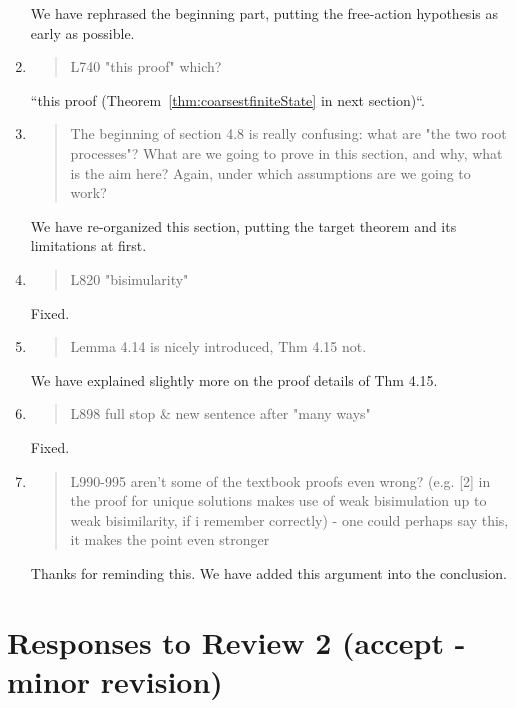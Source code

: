 \begin{enumerate}
  We have rephrased the beginning part, putting the free-action
  hypothesis as early as possible.
  
\item \begin{quote}
    L740 "this proof" which? 
  \end{quote}

  ``this proof (Theorem~\ref{thm:coarsestfiniteState} in next
  section)``.
  
\item \begin{quote}
    The beginning of section 4.8 is really confusing: what are "the
    two root processes"? What are we going to prove in this section,
    and why, what is the aim here? Again, under which assumptions are
    we going to work?
  \end{quote}

  We have re-organized this section, putting the target theorem and
  its limitations at first.
  
\item \begin{quote}
    L820 "bisimularity"
  \end{quote}
  Fixed.
  
\item \begin{quote}
    Lemma 4.14 is nicely introduced, Thm 4.15 not. 
  \end{quote}

  We have explained slightly more on the proof details of Thm 4.15.
  
\item \begin{quote}
    L898 full stop \& new sentence after "many ways"
  \end{quote}
  Fixed.
  
\item \begin{quote}
    L990-995 aren't some of the textbook proofs even wrong? (e.g. [2]
    in the proof for unique solutions makes use of weak bisimulation
    up to weak bisimilarity, if i remember correctly) - one could
    perhaps say this, it makes the point even stronger
  \end{quote}

  Thanks for reminding this. We have added this argument into the conclusion.
  
\end{enumerate}

\section*{Responses to Review 2 (accept - minor revision)}

